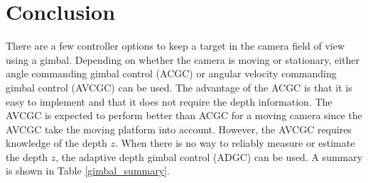\section{Conclusion}
There are a few controller options to keep a target in the camera field of view using a gimbal. Depending on whether the camera is moving or stationary, either angle commanding gimbal control (ACGC) or angular velocity commanding gimbal control (AVCGC) can be used. The advantage of the ACGC is that it is easy to implement and that it does not require the depth information. The AVCGC is expected to perform better than ACGC for a moving camera since the AVCGC take the moving platform into account. However, the AVCGC requires knowledge of the depth $z$. When there is no way to reliably measure or estimate the depth $z$, the adaptive depth gimbal control (ADGC) can be used. A summary is shown in Table \ref{gimbal_summary}.

\begin{table}[htbp]
	\centering
	\ifdim\wd\tempbox<\TPTminimum\relax 					\tempwidth=\TPTminimum\relax
	\else\tempwidth=\wd\tempbox
	\fi
	\begin{minipage}{\tempwidth}\centering
		\caption{Summary of gimbal control schemes}
		\label{gimbal_summary}
		\usebox{\tempbox}
	\end{minipage}
\end{table}